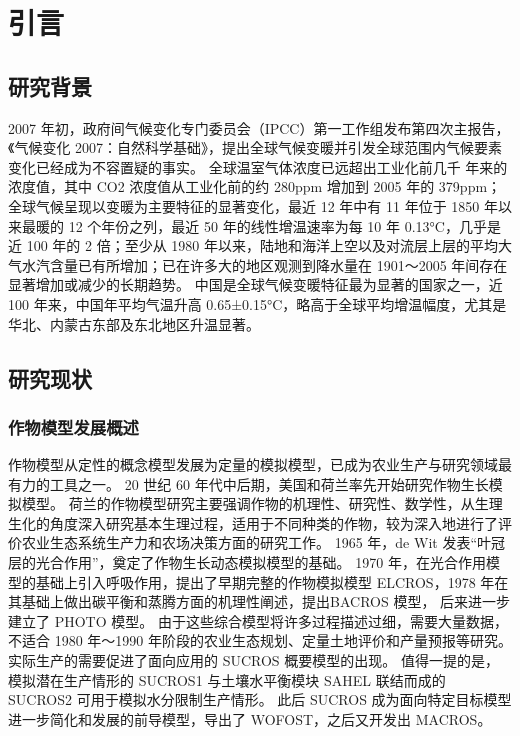 \documentclass[degree=bachelor]{thuthesis}
\begin{document}
\START
\showoutput

\tableofcontents

\mainmatter

\chapter{引言}

\section{研究背景}

2007 年初，政府间气候变化专门委员会（IPCC）第一工作组发布第四次主报告，《气候变化 2007：自然科学基础》，提出全球气候变暖并引发全球范围内气候要素变化已经成为不容置疑的事实\cite{xinximeng1994xinxi}。
全球温室气体浓度已远超出工业化前几千 年来的浓度值，其中 CO2 浓度值从工业化前的约 280ppm 增加到 2005 年的 379ppm；全球气候呈现以变暖为主要特征的显著变化，最近 12 年中有 11 年位于 1850 年以来最暖的 12 个年份之列，最近 50 年的线性增温速率为每 10 年 0.13°C，几乎是近 100 年的 2 倍；至少从 1980 年以来，陆地和海洋上空以及对流层上层的平均大气水汽含量已有所增加；已在许多大的地区观测到降水量在 1901～2005 年间存在显著增加或减少的长期趋势。
中国是全球气候变暖特征最为显著的国家之一，近 100 年来，中国年平均气温升高 0.65±0.15°C，略高于全球平均增温幅度，尤其是华北、内蒙古东部及东北地区升温显著。


\section{研究现状}

\subsection{作物模型发展概述}

作物模型从定性的概念模型发展为定量的模拟模型，已成为农业生产与研究领域最有力的工具之一。
20 世纪 60 年代中后期，美国和荷兰率先开始研究作物生长模拟模型。
荷兰的作物模型研究主要强调作物的机理性、研究性、数学性，从生理生化的角度深入研究基本生理过程，适用于不同种类的作物，较为深入地进行了评价农业生态系统生产力和农场决策方面的研究工作。
1965 年，de Wit 发表“叶冠层的光合作用”，奠定了作物生长动态模拟模型的基础。
1970 年，在光合作用模型的基础上引入呼吸作用，提出了早期完整的作物模拟模型 ELCROS，1978 年在其基础上做出碳平衡和蒸腾方面的机理性阐述，提出BACROS 模型， 后来进一步建立了 PHOTO 模型。
由于这些综合模型将许多过程描述过细，需要大量数据，不适合 1980 年～1990 年阶段的农业生态规划、定量土地评价和产量预报等研究。
实际生产的需要促进了面向应用的 SUCROS 概要模型的出现。
值得一提的是，模拟潜在生产情形的 SUCROS1 与土壤水平衡模块 SAHEL 联结而成的 SUCROS2 可用于模拟水分限制生产情形。
此后 SUCROS 成为面向特定目标模型 进一步简化和发展的前导模型，导出了 WOFOST，之后又开发出 MACROS。
\end{document}
